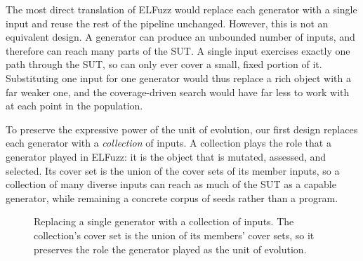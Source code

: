 The most direct translation of ELFuzz would replace each generator with a single input and reuse the rest of the pipeline unchanged. However, this is not an equivalent design. A generator can produce an unbounded number of inputs, and therefore can reach many parts of the SUT. A single input exercises exactly one path through the SUT, so can only ever cover a small, fixed portion of it. Substituting one input for one generator would thus replace a rich object with a far weaker one, and the coverage-driven search would have far less to work with at each point in the population.

To preserve the expressive power of the unit of evolution, our first design replaces each generator with a \textit{collection} of inputs. A collection plays the role that a generator played in ELFuzz: it is the object that is mutated, assessed, and selected. Its cover set is the union of the cover sets of its member inputs, so a collection of many diverse inputs can reach as much of the SUT as a capable generator, while remaining a concrete corpus of seeds rather than a program.

\lilspace
\begin{figure}[h]
    \centering
    \caption{Replacing a single generator with a collection of inputs. The collection's cover set is the union of its members' cover sets, so it preserves the role the generator played as the unit of evolution.}
    \label{fig:generator-to-collection}
\end{figure}

